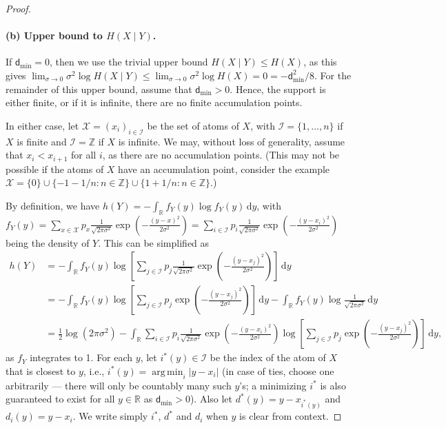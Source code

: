 \documentclass[10pt,a4paper]{amsart}
\DeclareMathOperator*{\argmin}{arg\,min}
\newcommand{\bbR}{\mathbb{R}}
\newcommand{\bbZ}{\mathbb{Z}}
\newcommand{\calI}{\mathcal{I}}
\newcommand{\calX}{\mathcal{X}}
\newcommand{\dmin}{\mathsf{d}_{\min}}
\newcommand{\intR}{\int_{\bbR}}
\renewcommand{\d}{\,\mathrm{d}}
\begin{document}
\begin{proof}[Proof]
		
		\paragraph{(b) Upper bound to $H(X \mid Y)$. }
		\sloppy
		
		If $\dmin = 0$, then we use the trivial upper bound $H(X \mid Y) \leq H(X)$, as this gives $\lim_{\sigma \to 0}  \sigma^2\log H(X \mid Y) \leq \lim_{\sigma \to 0} \sigma^2 \log H(X) = 0 = -\dmin^2/8$. 
		For the remainder of this upper bound, assume that $\dmin > 0$. 
		Hence, the support is either finite, or if it is infinite, there are no finite accumulation points. 
		
		In either case, let $\calX = (x_i)_{i \in \calI}$ be the set of atoms of $X$, with $\calI = \{1,\dots,n\}$ if $X$ is finite and $\calI = \bbZ$ if $X$ is infinite. We may, without loss of generality, assume that $x_i < x_{i+1}$ for all $i$, as there are no accumulation points. (This may not be possible if the atoms of $X$ have an accumulation point, consider the example $\calX = \{0\} \cup \{-1-1/n : n \in \bbZ\} \cup \{1 + 1/n : n \in \bbZ\}$.)
		
		
		
		
		By definition, we have $h(Y) = -\intR  f_Y(y) \log f_Y(y) \d y$, with $f_Y(y) = \sum_{x \in \calX} p_x  \frac{1}{\sqrt{2\pi \sigma^2}} \exp\left(-\frac{(y-x)^2}{2\sigma^2}\right) = \sum_{i \in \calI} p_i \frac{1}{\sqrt{2\pi \sigma^2}} \exp\left(-\frac{(y-x_i)^2}{2\sigma^2}\right)$ being the density of $Y$. This can be simplified as
		\begin{align*}
			h(Y) &= -\intR  f_Y(y) \log \left[\sum_{j \in \calI} p_j \tfrac{1}{\sqrt{2\pi \sigma^2}}\exp\left(-\frac{(y-x_j)^2}{2\sigma^2}\right)\right] \d y\\
			&= -\intR f_Y(y) \log \left[\sum_{j \in \calI} p_j \exp\left(-\frac{(y-x_j)^2}{2\sigma^2}\right)\right] \d y - \intR f_Y(y) \log\tfrac{1}{\sqrt{2\pi \sigma^2}}\d y\\
			&= \frac12\log(2\pi\sigma^2)-\intR \sum_{i \in \calI} p_i \tfrac{1}{\sqrt{2\pi \sigma^2}}\exp\left(-\frac{(y-x_i)^2}{2\sigma^2}\right) \log \left[\sum_{j \in \calI} p_j \exp\left(-\frac{(y-x_j)^2}{2\sigma^2}\right)\right] \d y,
		\end{align*}
		as $f_Y$ integrates to 1.  For each $y$, let $i^*(y) \in \calI$ be the index of the atom of $X$ that is closest to $y$, i.e., $i^*(y) = \argmin_i |y - x_i|$ (in case of ties, choose one arbitrarily --- there will only be countably many such $y$'s; a minimizing $i^*$ is also guaranteed to exist for all $y \in \bbR$ as $\dmin > 0$). Also let $d^*(y) = y - x_{i^*(y)}$ and $d_i(y) = y - x_i$. We write simply $i^*$, $d^*$ and $d_i$ when $y$ is clear from context. 
		

\end{proof}
\end{document}
